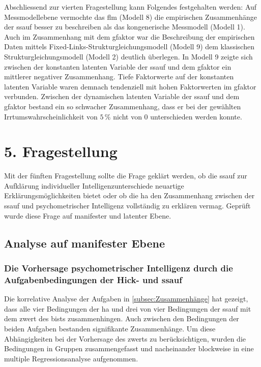 \documentclass[11pt, twoside, a4paper]{book}		%
\begin{document}
Abschliessend zur vierten Fragestellung kann Folgendes festgehalten werden: Auf Messmodellebene vermochte das \gls{flm} (Modell 8) die empirischen Zusammenhänge der \gls{ssauf} besser zu beschreiben als das kongenerische Messmodell (Modell 1). Auch im Zusammenhang mit dem \gls{gfaktor} war die Beschreibung der empirischen Daten mittels Fixed-Links-Struk\-tur\-glei\-chungs\-mo\-dell (Modell 9) dem klassischen Strukturgleichungsmodell (Modell 2) deutlich überlegen. 
In Modell 9 zeigte sich zwischen der konstanten latenten Variable der \gls{ssauf} und dem \gls{gfaktor} ein mittlerer negativer Zusammenhang. Tiefe Faktorwerte auf der konstanten latenten Variable waren demnach tendenziell mit hohen Faktorwerten im \gls{gfaktor} verbunden.
Zwischen der dynamischen latenten Variable der \gls{ssauf} und dem \gls{gfaktor} bestand ein so schwacher Zusammenhang, dass er bei der gewählten Irrtumswahrscheinlichkeit von $5\,\%$ nicht von 0 unterschieden werden konnte. 






\section{5. Fragestellung}

Mit der fünften Fragestellung sollte die Frage geklärt werden, ob die \gls{ssauf} zur Aufklärung individueller Intelligenzunterschiede neuartige Erklärungsmöglichkeiten bietet oder ob die \gls{ha} den Zusammenhang zwischen der \gls{ssauf} und psychometrischer Intelligenz vollständig zu erklären vermag. Geprüft wurde diese Frage auf manifester und latenter Ebene.

\subsection{Analyse auf manifester Ebene}

\subsubsection*{Die Vorhersage psychometrischer Intelligenz durch die Aufgabenbedingungen der Hick- und \gls{ssauf}}

Die korrelative Analyse der Aufgaben in \autoref{subsec:Zusammenhänge}  hat gezeigt, dass alle vier Bedingungen der \gls{ha} und drei von vier Bedingungen der \gls{ssauf} mit dem \gls{zwert} des \gls{bist}s zusammenhingen. Auch zwischen den Bedingungen der beiden Aufgaben bestanden signifikante Zusammenhänge. 
Um diese Abhängigkeiten bei der Vorhersage des \gls{zwert}s zu berücksichtigen, wurden die Bedingungen in Gruppen zusammengefasst und nacheinander blockweise in eine multiple Regressionsanalyse aufgenommen.
\end{document}
